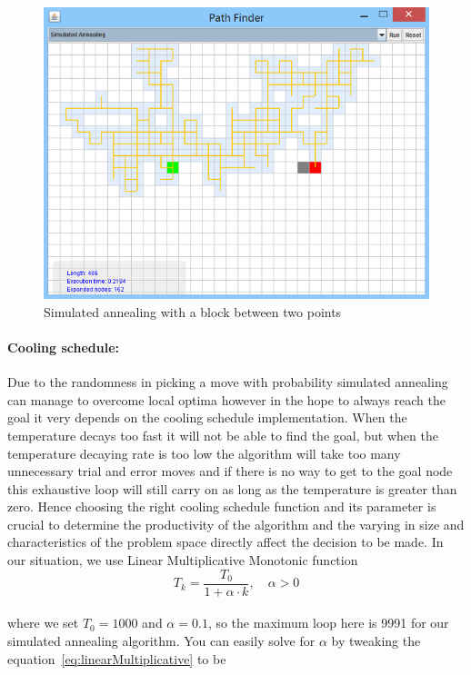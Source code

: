 \documentclass[a4paper]{article}
\begin{document}
\begin{figure}[h!]
  \centering
    \includegraphics[scale=.9]{images/sa1.png}
  \caption{Simulated annealing with a block between two points}
  \label{fig:simulatedAnnealing}
\end{figure}

\paragraph{Cooling schedule:} Due to the randomness in picking a move with probability simulated annealing can manage to overcome local optima however in the hope to always reach the goal it very depends on the cooling schedule implementation. When the temperature decays too fast it will not be able to find the goal, but when the temperature decaying rate is too low the algorithm will take too many unnecessary trial and error moves and if there is no way to get to the goal node this exhaustive loop will still carry on as long as the temperature is greater than zero. Hence choosing the right cooling schedule function and its parameter is crucial to determine the productivity of the algorithm and the varying in size and characteristics of the problem space directly affect the decision to be made. In our situation, we use Linear Multiplicative Monotonic function \\

\begin{equation} \label{eq:linearMultiplicative}
T_k = \frac{T_0}{1 + \alpha \cdot k}, \quad \alpha > 0
\end{equation}
\\
\noindent where we set $T_0 = 1000$ and $\alpha = 0.1$, so the maximum loop here is 9991 for our simulated annealing algorithm. You can easily solve for $\alpha$ by tweaking the equation~\ref{eq:linearMultiplicative} to be \\
\end{document}
